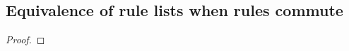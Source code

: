 \subsection{Equivalence of rule lists when rules commute}

\begin{theorem}
\end{theorem}

\begin{proof}
\end{proof}

